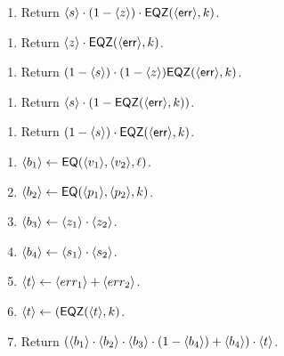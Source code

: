   \begin{enumerate}
    \item Return $\langle s \rangle \cdot (1-\langle z \rangle) \cdot \mathsf{EQZ}(\langle \mathsf{err} \rangle, k)$.
  \end{enumerate}

\begin{enumerate}
  \item Return $\langle z \rangle \cdot \mathsf{EQZ}(\langle \mathsf{err} \rangle, k)$.
\end{enumerate}

  \begin{enumerate}
    \item Return $(1-\langle s \rangle) \cdot (1-\langle z \rangle) \mathsf{EQZ}(\langle \mathsf{err} \rangle, k)$.
  \end{enumerate}

\begin{enumerate}
  \item Return $\langle s \rangle \cdot (1 - \mathsf{EQZ}(\langle \mathsf{err} \rangle, k))$.
\end{enumerate}

  \begin{enumerate}
    \item Return $(1-\langle s \rangle) \cdot \mathsf{EQZ}(\langle \mathsf{err} \rangle, k)$.
  \end{enumerate}

\begin{enumerate}
  \item $\langle b_1 \rangle \leftarrow \mathsf{EQ}(\langle v_1 \rangle,\langle v_2 \rangle,\ell)$.
  \item $\langle b_2 \rangle \leftarrow \mathsf{EQ}(\langle p_1 \rangle,\langle p_2 \rangle,k)$.
  \item $\langle b_3 \rangle \leftarrow \langle z_1 \rangle \cdot \langle z_2 \rangle$.
  \item $\langle b_4 \rangle \leftarrow \langle s_1 \rangle \cdot \langle s_2 \rangle$.
  \item $\langle t \rangle \leftarrow \langle err_1 \rangle + \langle err_2 \rangle$.
  \item $\langle t \rangle \leftarrow (\mathsf{EQZ}(\langle t \rangle, k)$.
  \item Return $(\langle b_1 \rangle \cdot \langle b_2 \rangle \cdot \langle b_3 \rangle \cdot (1 - \langle b_4 \rangle) + \langle b_4 \rangle) \cdot \langle t \rangle$.
\end{enumerate}

